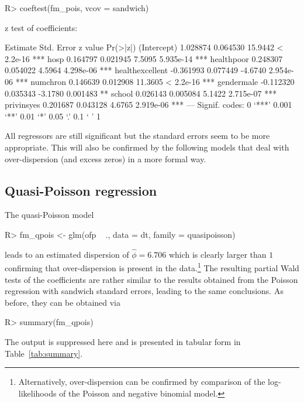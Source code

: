 \documentclass{Z}
\begin{document}
\begin{Schunk}
\begin{Sinput}
R> coeftest(fm_pois, vcov = sandwich)
\end{Sinput}
\begin{Soutput}
z test of coefficients:

                 Estimate Std. Error z value  Pr(>|z|)    
(Intercept)      1.028874   0.064530 15.9442 < 2.2e-16 ***
hosp             0.164797   0.021945  7.5095 5.935e-14 ***
healthpoor       0.248307   0.054022  4.5964 4.298e-06 ***
healthexcellent -0.361993   0.077449 -4.6740 2.954e-06 ***
numchron         0.146639   0.012908 11.3605 < 2.2e-16 ***
gendermale      -0.112320   0.035343 -3.1780  0.001483 ** 
school           0.026143   0.005084  5.1422 2.715e-07 ***
privinsyes       0.201687   0.043128  4.6765 2.919e-06 ***
---
Signif. codes:  0 ‘***’ 0.001 ‘**’ 0.01 ‘*’ 0.05 ‘.’ 0.1 ‘ ’ 1 
\end{Soutput}
\end{Schunk}
All regressors are still significant but the standard errors seem to be more
appropriate. This will also be confirmed by the following models that
deal with over-dispersion (and excess zeros) in a more formal way.

\subsection{Quasi-Poisson regression}

The quasi-Poisson model
\begin{Schunk}
\begin{Sinput}
R> fm_qpois <- glm(ofp ~ ., data = dt, family = quasipoisson)
\end{Sinput}
\end{Schunk}
leads to an estimated dispersion of
$\hat \phi = 6.706$ which
is clearly larger than $1$ confirming that over-dispersion is present in
the data.\footnote{Alternatively, over-dispersion can be confirmed by comparison
of the log-likelihoods of the Poisson and negative binomial model.}
The resulting partial Wald tests of the coefficients
are rather similar to the results obtained from the Poisson regression with
sandwich standard errors, leading to the same conclusions. As before, they
can be obtained via
\begin{Schunk}
\begin{Sinput}
R> summary(fm_qpois)
\end{Sinput}
\end{Schunk}
The output is suppressed here and is presented in tabular form in Table~\ref{tab:summary}.
\end{document}
